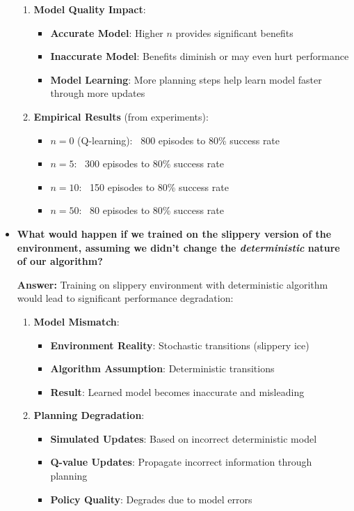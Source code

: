 \begin{itemize}
\begin{enumerate}
        \item \textbf{Model Quality Impact}:
        \begin{itemize}
            \item \textbf{Accurate Model}: Higher $n$ provides significant benefits
            \item \textbf{Inaccurate Model}: Benefits diminish or may even hurt performance
            \item \textbf{Model Learning}: More planning steps help learn model faster through more updates
        \end{itemize}
        
        \item \textbf{Empirical Results} (from experiments):
        \begin{itemize}
            \item $n = 0$ (Q-learning): ~800 episodes to 80\% success rate
            \item $n = 5$: ~300 episodes to 80\% success rate
            \item $n = 10$: ~150 episodes to 80\% success rate
            \item $n = 50$: ~80 episodes to 80\% success rate
        \end{itemize}
    \end{enumerate}
    
    \item \textbf{What would happen if we trained on the slippery version of the environment, assuming we \textbf{didn't} change the \textit{deterministic} nature of our algorithm?}
    
    \textbf{Answer:} Training on slippery environment with deterministic algorithm would lead to significant performance degradation:
    
    \begin{enumerate}
        \item \textbf{Model Mismatch}:
        \begin{itemize}
            \item \textbf{Environment Reality}: Stochastic transitions (slippery ice)
            \item \textbf{Algorithm Assumption}: Deterministic transitions
            \item \textbf{Result}: Learned model becomes inaccurate and misleading
        \end{itemize}
        
        \item \textbf{Planning Degradation}:
        \begin{itemize}
            \item \textbf{Simulated Updates}: Based on incorrect deterministic model
            \item \textbf{Q-value Updates}: Propagate incorrect information through planning
            \item \textbf{Policy Quality}: Degrades due to model errors
        \end{itemize}
        

\end{enumerate}
\end{itemize}
